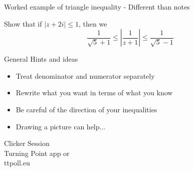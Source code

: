 \documentclass{beamer}
\begin{document}
\begin{frame}{Worked example of triangle inequality - Different than notes}


Show that if $|z+2i|\leq 1$, then we 
$$\frac{1}{\sqrt{5}+1}\leq \left|\frac{1}{z+1}\right| \leq \frac{1}{\sqrt{5}-1}$$  
 
\begin{block}{General Hints and ideas} 
 \begin{itemize}
     \item Treat denominator and numerator separately
     \item Rewrite what you want in terms of what you know
     \item Be careful of the direction of your inequalities
     \item Drawing a picture can help...
 \end{itemize}
 
 
 \end{block} 
  \end{frame}

\begin{frame}
  
\begin{center}

\Huge

Clicker Session \\
Turning Point app or \\
ttpoll.eu 

\end{center}

\end{frame}
\end{document}
